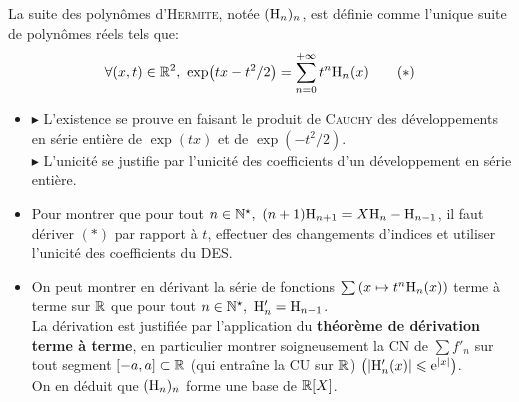 \begin{tcolorbox}
    La suite des polynômes d'\textsc{Hermite}, notée $(\mathrm{H}_n)_n$, est définie comme l'unique suite de polynômes réels tels que:
    $$\forall(x, t) \in \mathbb{R}^2,\ \exp(tx-t^2/2) = \sum_{n=0}^{+\infty} t^n \mathrm{H}_n(x) \qquad (*)$$
\end{tcolorbox}

\begin{itemize}
\item $\blacktriangleright$ L'existence se prouve en faisant le produit de \textsc{Cauchy} des développements en série entière de $\exp(tx)$ et de $\exp(-t^2/2)$.\\
$\blacktriangleright$ L'unicité se justifie par l'unicité des coefficients d'un développement en série entière. 
\item Pour montrer que pour tout $n \in \Ne,\ (n+1)\Hermite_{n+1}=X\Hermite_n-\Hermite_{n-1}$, il faut dériver $(*)$ par rapport à $t$, effectuer des changements d'indices et utiliser l'unicité des coefficients du DES. 
\item On peut montrer en dérivant  la série de fonctions $\sum \left(x \mapsto t^n \mathrm{H}_n(x) \right)$ terme à terme sur $\mathbb{R}$ que pour tout $n \in \Ne,\ \Hermite'_n=\Hermite_{n-1}$.\\
La dérivation est justifiée par l'application du \textbf{théorème de dérivation terme à terme}, en particulier montrer soigneusement la CN de $\sum f'_n$ sur tout segment $[-a, a] \subset \mathbb{R}$ (qui entraîne la CU sur $\mathbb{R}$) $\left(|\mathrm{H}'_n(x)| \leqslant \mathrm{e}^{|x|} \right)$.\\
On en déduit que $(\mathrm{H}_n)_n$ forme une base de $\mathbb{R}[X]$.\\
\end{itemize}